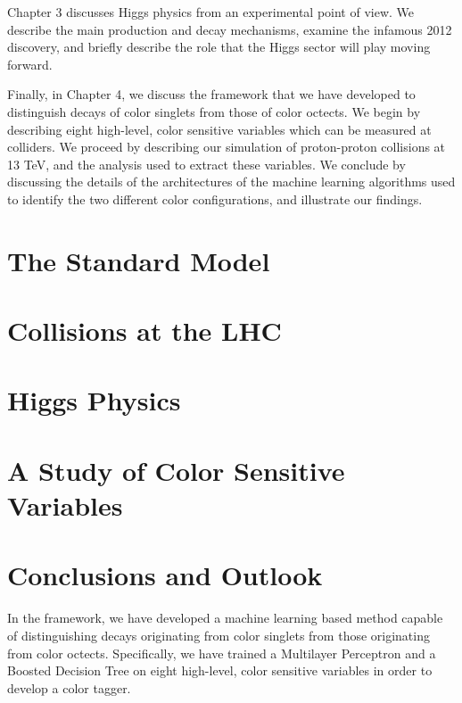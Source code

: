 \documentclass[10pt,a4paper]{book}
\begin{document}
Chapter 3 discusses Higgs physics from an experimental point of view. We describe the main production and decay mechanisms, examine the infamous 2012 discovery, and briefly describe the role that the Higgs sector will play moving forward.

Finally, in Chapter 4, we discuss the framework that we have developed to distinguish decays of color singlets from those of color octects. We begin by describing eight high-level, color sensitive variables which can be measured at colliders. We proceed by describing our simulation of proton-proton collisions at 13 TeV, and the analysis used to extract these variables. We conclude by discussing the details of the architectures of the machine learning algorithms used to identify the two different color configurations, and illustrate our findings.

\chapter{The Standard Model}


\chapter{Collisions at the LHC}


\chapter{Higgs Physics}


\chapter{A Study of Color Sensitive Variables}


\chapter*{Conclusions and Outlook}

In the framework, we have developed a machine learning based method capable of distinguishing decays originating from color singlets from those originating from color octects. Specifically, we have trained a Multilayer Perceptron and a Boosted Decision Tree on eight high-level, color sensitive variables in order to develop a color tagger.
\end{document}

